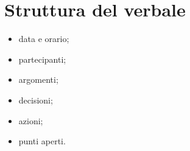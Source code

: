 \section{Struttura del verbale}

\begin{itemize}
  \item data e orario;
  \item partecipanti;
  \item argomenti;
  \item decisioni;
  \item azioni;
  \item punti aperti.
\end{itemize}